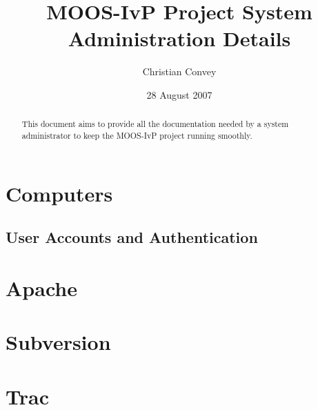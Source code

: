\documentclass[letterpaper,10pt]{article}
\title{MOOS-IvP Project System Administration Details}
\author{Christian Convey}
\date{28 August 2007}
\begin{document}
\maketitle

\begin{abstract}
This document aims to provide all the documentation needed by a system administrator to keep
the MOOS-IvP project running smoothly.
\end{abstract}


\tableofcontents

\section{Computers}
\subsection{User Accounts and Authentication}

\section{Apache}
\section{Subversion}
\section{Trac}
\end{document}
